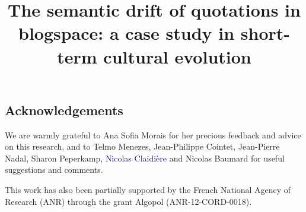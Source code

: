 \documentclass[jou]{apa6}
\title{The semantic drift of quotations in blogspace: a case study in short-term cultural evolution}
\date{}
\newcommand{\tg}[1]{\textcolor{MidnightBlue}{#1}}
\newcommand{\newtext}[1]{\tg{#1}}
\begin{document}
\maketitle







\subsection*{Acknowledgements}

We are warmly grateful to Ana Sofia Morais for her precious feedback and advice on this research, and to Telmo Menezes, Jean-Philippe Cointet, Jean-Pierre Nadal, Sharon Peperkamp, \newtext{Nicolas Claidière} and Nicolas Baumard for useful suggestions and comments.

{\new This work has also been partially supported by the French National Agency of Research (ANR) through the grant Algopol (ANR-12-CORD-0018).}




\appendix

\end{document}
